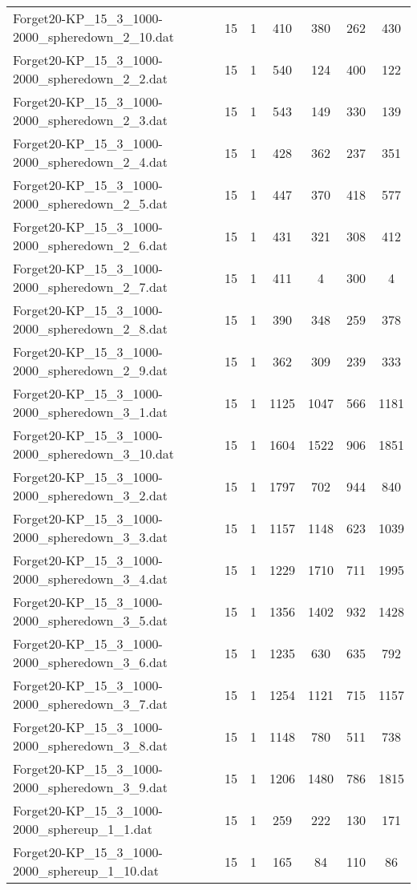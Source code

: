 \begin{table}[!ht]
\begin{tabular}{lcccccc}
Forget20-KP\_15\_3\_1000-2000\_spheredown\_2\_10.dat & 15 & 1 & 410 & 380 & 262 & 430 \\
Forget20-KP\_15\_3\_1000-2000\_spheredown\_2\_2.dat & 15 & 1 & 540 & 124 & 400 & 122 \\
Forget20-KP\_15\_3\_1000-2000\_spheredown\_2\_3.dat & 15 & 1 & 543 & 149 & 330 & 139 \\
Forget20-KP\_15\_3\_1000-2000\_spheredown\_2\_4.dat & 15 & 1 & 428 & 362 & 237 & 351 \\
Forget20-KP\_15\_3\_1000-2000\_spheredown\_2\_5.dat & 15 & 1 & 447 & 370 & 418 & 577 \\
Forget20-KP\_15\_3\_1000-2000\_spheredown\_2\_6.dat & 15 & 1 & 431 & 321 & 308 & 412 \\
Forget20-KP\_15\_3\_1000-2000\_spheredown\_2\_7.dat & 15 & 1 & 411 & 4 & 300 & 4 \\
Forget20-KP\_15\_3\_1000-2000\_spheredown\_2\_8.dat & 15 & 1 & 390 & 348 & 259 & 378 \\
Forget20-KP\_15\_3\_1000-2000\_spheredown\_2\_9.dat & 15 & 1 & 362 & 309 & 239 & 333 \\
Forget20-KP\_15\_3\_1000-2000\_spheredown\_3\_1.dat & 15 & 1 & 1125 & 1047 & 566 & 1181 \\
Forget20-KP\_15\_3\_1000-2000\_spheredown\_3\_10.dat & 15 & 1 & 1604 & 1522 & 906 & 1851 \\
Forget20-KP\_15\_3\_1000-2000\_spheredown\_3\_2.dat & 15 & 1 & 1797 & 702 & 944 & 840 \\
Forget20-KP\_15\_3\_1000-2000\_spheredown\_3\_3.dat & 15 & 1 & 1157 & 1148 & 623 & 1039 \\
Forget20-KP\_15\_3\_1000-2000\_spheredown\_3\_4.dat & 15 & 1 & 1229 & 1710 & 711 & 1995 \\
Forget20-KP\_15\_3\_1000-2000\_spheredown\_3\_5.dat & 15 & 1 & 1356 & 1402 & 932 & 1428 \\
Forget20-KP\_15\_3\_1000-2000\_spheredown\_3\_6.dat & 15 & 1 & 1235 & 630 & 635 & 792 \\
Forget20-KP\_15\_3\_1000-2000\_spheredown\_3\_7.dat & 15 & 1 & 1254 & 1121 & 715 & 1157 \\
Forget20-KP\_15\_3\_1000-2000\_spheredown\_3\_8.dat & 15 & 1 & 1148 & 780 & 511 & 738 \\
Forget20-KP\_15\_3\_1000-2000\_spheredown\_3\_9.dat & 15 & 1 & 1206 & 1480 & 786 & 1815 \\
Forget20-KP\_15\_3\_1000-2000\_sphereup\_1\_1.dat & 15 & 1 & 259 & 222 & 130 & 171 \\
Forget20-KP\_15\_3\_1000-2000\_sphereup\_1\_10.dat & 15 & 1 & 165 & 84 & 110 & 86 \\

\end{tabular}
\end{table}
